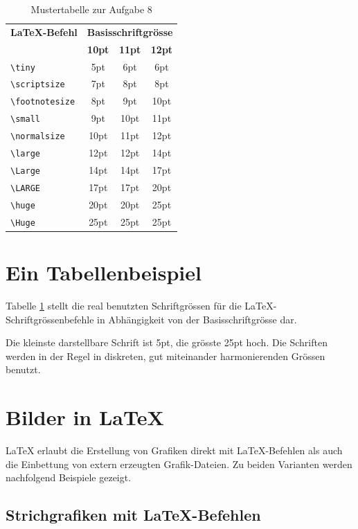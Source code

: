 \documentclass[11pt, a4paper,draft]{article}
\newcommand{\ltx}{\LaTeX}
\begin{document}
\begin{table}[t]
\caption{Mustertabelle zur Aufgabe 8  \label{tab:Schriftgroessen}}
\centering
\begin{tabular}{lccc}
\toprule
\textbf{\ltx-Befehl} & \multicolumn{3}{c}{\textbf{Basisschriftgrösse}}\\
\cline{2-4} & \textbf{10pt} & \textbf{11pt} & \textbf{12pt}\\
\midrule
\midrule
\verb+\tiny+			& 5pt & 6pt 	& 6pt\\
\verb+\scriptsize+		& 7pt & 8pt		& 8pt\\
\verb+\footnotesize+	& 8pt & 9pt		& 10pt\\
\verb+\small+			& 9pt & 10pt	& 11pt\\
\midrule
\midrule
\verb+\normalsize+		& 10pt	& 11pt	& 12pt\\
\midrule
\midrule
\verb+\large+			& 12pt	& 12pt	& 14pt\\
\verb+\Large+			& 14pt	& 14pt	& 17pt\\
\verb+\LARGE+			& 17pt	& 17pt	& 20pt\\
\verb+\huge+			& 20pt	& 20pt	& 25pt\\
\verb+\Huge+			& 25pt	& 25pt	& 25pt\\
\bottomrule
\end{tabular}
\end{table}%

\section{Ein Tabellenbeispiel}
Tabelle \ref{tab:Schriftgroessen} stellt die real benutzten Schriftgrössen für die \ltx-Schriftgrössenbefehle in Abhängigkeit von der Basisschriftgrösse dar.\par
Die kleinste darstellbare Schrift ist 5pt, die grösste 25pt hoch. Die Schriften werden in der Regel in diskreten, gut miteinander harmonierenden Grössen benutzt.

\section{Bilder in \ltx}
\ltx{} erlaubt die Erstellung von Grafiken direkt mit \ltx-Befehlen als auch die Einbettung von extern erzeugten Grafik-Dateien. Zu beiden Varianten werden nachfolgend Beispiele gezeigt.




\subsection{Strichgrafiken mit \ltx-Befehlen}
\end{document}
